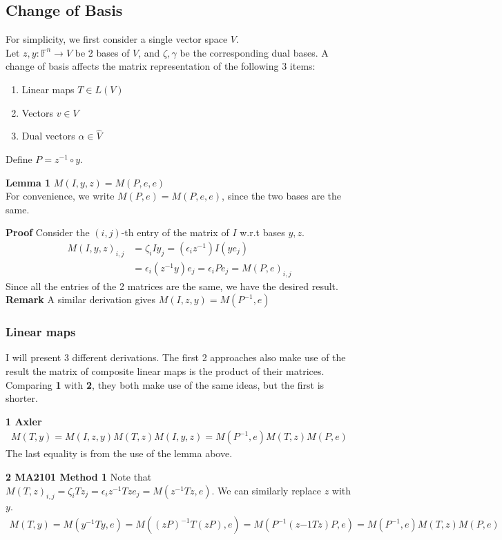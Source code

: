 \documentclass{article}
\begin{document}
\subsection{Change of Basis}
For simplicity, we first consider a single vector space $V$.\\
Let $z,y: \mathbb{F}^n\rightarrow V$ be 2 bases of $V$, and $\zeta, \gamma$ be the corresponding dual bases.
A change of basis affects the matrix representation of the following 3 items:
\begin{enumerate}
	\item Linear maps $T\in L(V)$
	\item Vectors $v\in V$
	\item Dual vectors $\alpha \in \hat{V}$
\end{enumerate}

Define $P=z^{-1}\circ y$.

\textbf{Lemma 1} $M(I, y, z) = M(P, e, e)$\\
For convenience, we write $M(P, e) = M(P,e,e)$, since the two bases are the same.

\textbf{Proof} Consider the $(i,j)$-th entry of the matrix of $I$ w.r.t bases $y, z$. 
\begin{align*}
	M(I, y, z)_{i,j}&=\zeta_iIy_j=(\epsilon_iz^{-1})I(ye_j)\\
	&=\epsilon_i(z^{-1}y)e_j=\epsilon_iPe_j=M(P, e)_{i,j}
\end{align*}
Since all the entries of the 2 matrices are the same, we have the desired result.
\textbf{Remark} A similar derivation gives $M(I, z, y) = M(P^{-1}, e)$

\subsubsection{Linear maps}
I will present 3 different derivations. The first 2 approaches also make use of the result the matrix of composite linear maps is the product of their matrices. Comparing \textbf{1} with \textbf{2}, they both make use of the same ideas, but the first is shorter.

\textbf{1 Axler}
\begin{align*}
	M(T, y) = M(I, z, y)M(T, z)M(I, y, z) = M(P^{-1}, e)M(T, z)M(P, e)
\end{align*}
The last equality is from the use of the lemma above.

\textbf{2 MA2101 Method 1}
Note that $M(T,z)_{i,j}=\zeta_iTz_j = \epsilon_iz^{-1}Tze_j=M(z^{-1}Tz, e)$. We can similarly replace $z$ with $y$.
\begin{align*}
	M(T, y) = M(y^{-1}Ty, e) = M((zP)^{-1}T(zP),e) = M(P^{-1}(z{-1}Tz)P,e) =  M(P^{-1}, e)M(T, z)M(P, e)
\end{align*}
\end{document}
